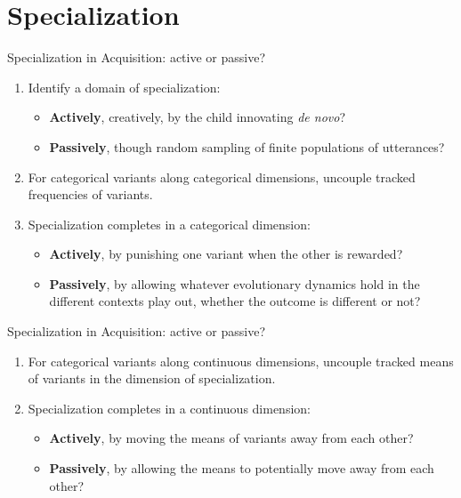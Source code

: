 \documentclass[hyperref={pdfpagelabels=false}]{beamer}
\begin{document}
\section{Specialization}
\begin{frame}{Specialization in Acquisition: active or passive?}
		\begin{enumerate}
			\item Identify a domain of specialization:
				\begin{itemize}
					\item \textbf{Actively}, creatively, by the child innovating \textsl{de novo}?
					\item \textbf{Passively}, though random sampling of finite populations of utterances?
				\end{itemize}
			\item For categorical variants along categorical dimensions, uncouple tracked frequencies of variants.
			\item Specialization completes in a categorical dimension:
			\begin{itemize}
				\item \textbf{Actively}, by punishing one variant when the other is rewarded?
				\item \textbf{Passively}, by allowing whatever evolutionary dynamics hold in the different contexts play out, whether the outcome is different or not?
			\end{itemize}
		\end{enumerate}
\end{frame}

\begin{frame}{Specialization in Acquisition: active or passive?}
		\begin{enumerate}
			\item For categorical variants along continuous dimensions, uncouple tracked means of variants in the dimension of specialization.
			\item Specialization completes in a continuous dimension:
			\begin{itemize}
				\item \textbf{Actively}, by moving the means of variants away from each other?
				\item \textbf{Passively}, by allowing the means to potentially move away from each other?
			\end{itemize}
		\end{enumerate}
\end{frame}
\end{document}
